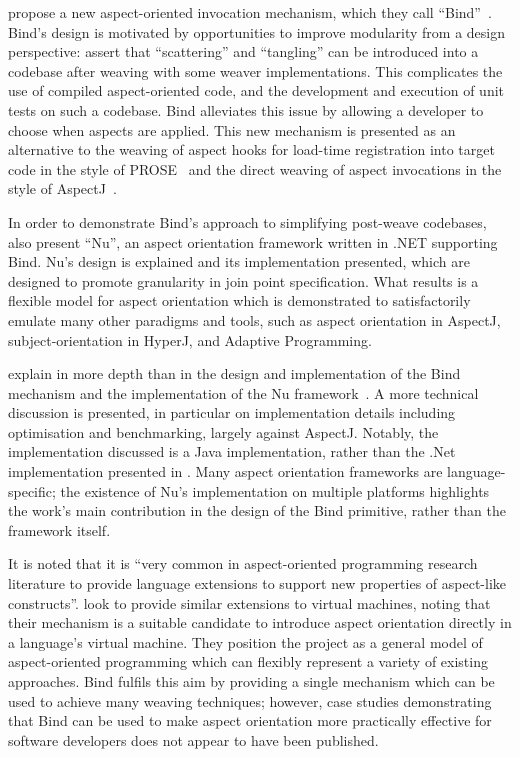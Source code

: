 \citeauthor{rajan2006nu_towardsao_invocation} propose a new aspect-oriented
invocation mechanism, which they call
``Bind''~\cite{rajan2006nu_towardsao_invocation}. Bind's design is motivated by
opportunities to improve modularity from a design perspective:
\citeauthor{rajan2006nu_towardsao_invocation} assert that ``scattering'' and
``tangling'' can be introduced into a codebase after weaving with some weaver
implementations. This complicates the use of compiled aspect-oriented code, and
the development and execution of unit tests on such a codebase. Bind alleviates
this issue by allowing a developer to choose when aspects are applied. This new
mechanism is presented as an alternative to the weaving of aspect hooks for
load-time registration into target code in the style of
PROSE~\cite{popovici2002PROSE,popovici2003JITaspects} and the direct weaving of
aspect invocations in the style of AspectJ~\cite{aspectj_intro}.

In order to demonstrate Bind's approach to simplifying post-weave codebases,
\citeauthor{rajan2006_towardsao_invocation} also present ``Nu'', an
aspect orientation framework written in .NET supporting Bind. Nu's design is
explained and its implementation presented, which are designed to promote
granularity in join point specification. What results is a flexible model for
aspect orientation which is demonstrated to satisfactorily emulate many other
paradigms and tools, such as aspect orientation in AspectJ, subject-orientation
in HyperJ, and Adaptive Programming.

\citeauthor{dyerNUmasters} explain in more depth than in the design
and implementation of the Bind mechanism and the implementation of the Nu
framework~\cite{dyerNUmasters}. A more technical discussion is presented, in
particular on implementation details including optimisation and benchmarking,
largely against AspectJ. Notably, the implementation discussed is a Java
implementation, rather than the .Net implementation presented in
\cite{rajan2006nu}. Many aspect orientation frameworks are language-specific;
the existence of Nu's implementation on multiple platforms highlights the work's
main contribution in the design of the Bind primitive, rather than the
framework itself.

It is noted that it is ``very common in aspect-oriented programming research
literature to provide language extensions to support new properties of
aspect-like constructs''. \citeauthor{rajan2006_towardsao_invocation} look to
provide similar extensions to virtual machines, noting that their mechanism is a
suitable candidate to introduce aspect orientation directly in a language's
virtual machine. They position the project as a general model of aspect-oriented
programming which can flexibly represent a variety of existing approaches. Bind
fulfils this aim by providing a single mechanism which can be used to achieve
many weaving techniques; however, case studies demonstrating that Bind can be
used to make aspect orientation more practically effective for software
developers does not appear to have been published.


